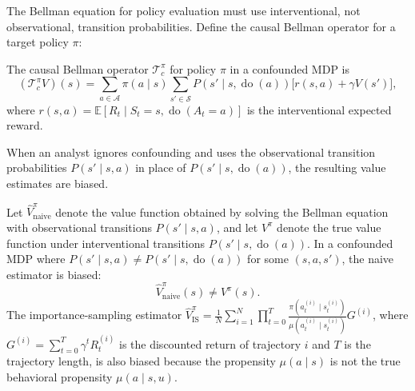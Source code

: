 The Bellman equation for policy evaluation must use interventional, not observational, transition probabilities. Define the causal Bellman operator for a target policy $\pi$:
\begin{definition}
\label{def:causal_bellman}
The causal Bellman operator $\mathcal{T}_c^\pi$ for policy $\pi$ in a confounded MDP is
\begin{equation}
(\mathcal{T}_c^\pi V)(s) = \sum_{a \in \mathcal{A}} \pi(a \mid s) \sum_{s' \in \mathcal{S}} P(s' \mid s, \operatorname{do}(a)) \bigl[ r(s, a) + \gamma V(s') \bigr],
\label{eq:causal_bellman}
\end{equation}
where $r(s,a) = \mathbb{E}[R_t \mid S_t = s, \operatorname{do}(A_t = a)]$ is the interventional expected reward.
\end{definition}

When an analyst ignores confounding and uses the observational transition probabilities $P(s' \mid s, a)$ in place of $P(s' \mid s, \operatorname{do}(a))$, the resulting value estimates are biased.

\begin{lemma}
\label{lem:naive_bias}
Let $\hat{V}^{\pi}_{\text{naive}}$ denote the value function obtained by solving the Bellman equation with observational transitions $P(s' \mid s, a)$, and let $V^\pi$ denote the true value function under interventional transitions $P(s' \mid s, \operatorname{do}(a))$. In a confounded MDP where $P(s' \mid s, a) \neq P(s' \mid s, \operatorname{do}(a))$ for some $(s, a, s')$, the naive estimator is biased:
\begin{equation}
\hat{V}^{\pi}_{\text{naive}}(s) \neq V^\pi(s).
\end{equation}
The importance-sampling estimator $\hat{V}^{\pi}_{\text{IS}} = \frac{1}{N} \sum_{i=1}^N \prod_{t=0}^{T} \frac{\pi(a_t^{(i)} \mid s_t^{(i)})}{\mu(a_t^{(i)} \mid s_t^{(i)})} G^{(i)}$, where $G^{(i)} = \sum_{t=0}^{T} \gamma^t R_t^{(i)}$ is the discounted return of trajectory $i$ and $T$ is the trajectory length, is also biased because the propensity $\mu(a \mid s)$ is not the true behavioral propensity $\mu(a \mid s, u)$.
\end{lemma}

